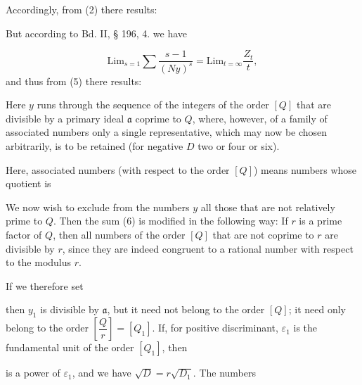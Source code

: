 
Accordingly, from (2) there results:

But according to Bd. II, § 196, 4. we have

\[ \mathrm{Lim}_{s=1}\sum\frac{s-1}{(Ny)^s} = \mathrm{Lim}_{t=\infty}\frac{Z_t}{t}, \]
and thus from (5) there results:

Here $y$ runs through the sequence of the integers of the order
$[Q]$ that are divisible by a primary ideal $\mathfrak{a}$ coprime to $Q$,
where, however, of a family of associated numbers only a single
representative, which may now be chosen arbitrarily, is to be
retained (for negative $D$ two or four or six).

Here, associated numbers (with respect to the order $[Q]$) means numbers
whose quotient is 

We now wish to exclude from the numbers $y$ all those that
are not relatively prime to $Q$. Then the sum (6) is modified in
the following way: If $r$ is a prime factor of $Q$, then all numbers
of the order $[Q]$ that are not coprime to $r$ are divisible by $r$,
since they are indeed congruent to a rational number with respect
to the modulus $r$.

If we therefore set

then $y_1$ is divisible by $\mathfrak{a}$, but it need not belong to the order $[Q]$;
it need only belong to the order $\left[\dfrac{Q}{r}\right] = [Q_1]$. If, for
positive discriminant, $\varepsilon_1$ is the fundamental unit of the order
$[Q_1]$, then

is a power of $\varepsilon_1$, and we have $\sqrt D = r\sqrt{D_1}$. The numbers

